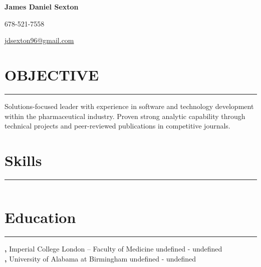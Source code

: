 \documentclass{article}
\newcommand{\name}[1]{\begin{center}{\Large\textbf{#1}}\end{center}}
\newcommand{\address}[1]{\begin{center}#1\end{center}}
\newenvironment{rSection}[1]{\section*{#1}\hrule\vspace{0.5em}}{\vspace{1em}}
\begin{document}
\name{James Daniel Sexton}
\address{678-521-7558}
\address{\href{mailto:jdsexton96@gmail.com}{jdsexton96@gmail.com}}


\begin{rSection}{OBJECTIVE}
{Solutions-focused leader with experience in software and technology development within the pharmaceutical industry. Proven strong analytic capability through technical projects and peer-reviewed publications in competitive journals.}
\end{rSection}


\begin{rSection}{Skills}
\begin{table}[h]
\centering
\begin{tabularx}{\textwidth}{lX}



















\end{tabularx}
\end{table}
\end{rSection}


\begin{rSection}{Education}
\textbf, Imperial College London – Faculty of Medicine \hfill{undefined - undefined} \\
\textbf, University of Alabama at Birmingham \hfill{undefined - undefined} \\
\end{rSection}
\end{document}
